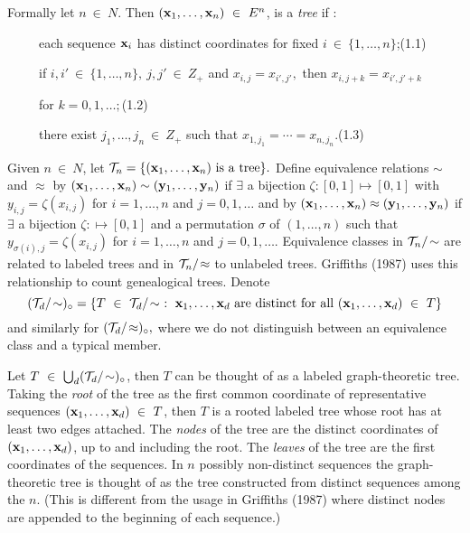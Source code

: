 Formally let $n ~\in~ N$. Then $({\bf x}_1,\ldots ,{\bf x}_n) ~\in~ E^n$,
is a {\em  tree }if : 

~~~~~each sequence ${\bf x}_i$ has distinct coordinates for fixed
$i ~\in~ \{1, \ldots ,n \}$;\hfill (1.1)

~~~~~if $i,i' ~\in~ \{1, \ldots ,n\},~j,j' ~\in~ Z_+$ and $x_{i,j}
= x_{i',j'},$ 
 then $x_{i,j+k} = x_{i',j'+k}$

~~~~~for $k = 0,1, \ldots ;$\hfill (1.2)

~~~~~there exist $j_1, \ldots ,j_n ~\in~ Z_+$ such that
$x_{1,j_1} = \cdots = x_{n,j_n}. $\hfill (1.3)

Given $n~\in~ N$, let ${\cal T}_n = \{({\bf x}_1, \ldots ,{\bf x}_n)
~{\rm is~a~tree} \}.$
Define equivalence relations $\sim$ and $\approx$ 
by $({\bf x}_1, \ldots ,{\bf x}_n)
\sim ({\bf y}_1,\ldots ,{\bf y}_n)$ if $\exists$ a bijection 
$\zeta : [0,1] \mapsto [0,1]$
with $y_{i,j} = \zeta (x_{i,j})$ for $i = 1, \ldots ,n$ and $j = 0,1, \ldots$
and by $({\bf x}_1, \ldots ,{\bf x}_n) \approx ({\bf y}_1, \ldots ,{\bf y}_n)$
if $\exists$ a bijection $ \zeta : \mapsto [0,1]$ and a permutation $\sigma$ of
$(1, \ldots ,n)$ such that $y_{ \sigma (i),j} = \zeta(x_{i,j})$ for 
$i = 1, \ldots ,n$ and $j = 0,1, \ldots .$ Equivalence classes in 
${\cal T}_n /\!\sim$ are related to labeled trees and in 
${\cal T}_n /\!\approx$ to unlabeled trees. Griffiths (1987) uses
this relationship to count genealogical trees. Denote
$$({\cal T}_d /\!\sim)_{\circ} = \{T ~\in~ {\cal T}_d /\!\sim~:~
{\bf x}_1, \ldots ,{\bf x}_d{\rm ~are~distinct~for~all~}
({\bf x}_1, \ldots, {\bf x}_d)~\in
~T \}$$ and similarly for $({\cal T}_d /\!\approx )_{\circ},$
where we do not distinguish between an equivalence class and a typical 
member.

Let $T~\in~\bigcup_d ({\cal T}_d /\!\sim)_{\circ}$, then $T$ can be thought 
of as a labeled graph-theoretic tree. Taking the {\em root} of the tree 
as the first common coordinate of representative sequences 
$({\bf x}_1, \ldots ,{\bf x}_d)~\in~T$, then $T$ is a rooted labeled tree
whose root has at least two edges attached.
The {\em nodes} of the tree are the distinct coordinates of
$({\bf x}_1, \ldots, {\bf x}_d)$, up to and including the root.
The {\em leaves} of the tree are the first coordinates of the sequences.
In $n$ possibly non-distinct sequences the graph-theoretic tree is thought
of as the tree constructed from distinct sequences among the $n$.
(This is different from the usage in Griffiths (1987) where distinct nodes 
are appended to the beginning of each sequence.)

